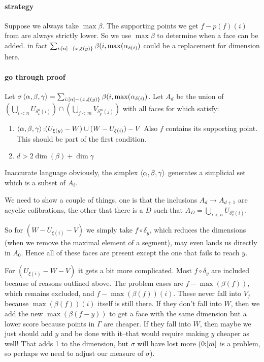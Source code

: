 \documentclass[csh.tex]{subfiles}
\begin{document}
\paragraph{strategy}
Suppose we always take $\max\beta$. 
The supporting points we get $f-p(f)(i)$ from are always strictly lower. So we 
use $\max\beta$ to determine when a face can be added.
in fact $\sum_{i\mathord : [n]-\left\{x,\xi(y)\right\}} \beta(i,\max(\alpha_{\delta(i)})$ could
be a replacement for dimension here.

\paragraph{go through proof}
Let $\sigma\left\langle \alpha,\beta,\gamma \right\rangle = \sum_{i\mathord : [n]-\left\{x,\xi(y)\right\}} \beta(i,\max(\alpha_{\delta(i)})$.
Let $A_d$ be the union of 
$(\bigcup_{i<n} U_{\delta^n_x(i)}) \cap (\bigcup_{j<m} V_{\delta^m_y(j)})$ with 
all faces for which satisfy:
\begin{enumerate}
  \item $\left\langle \alpha,\beta,\gamma \right\rangle\mathord : (U_{\xi(y)}-W)\cup(W-U_{\xi(i)}) - V$
  Also $f$ contains its supporting point.
  This should be part of the first condition.
  \item $d > 2\dim(\beta)+\dim\gamma$
\end{enumerate}
Inaccurate language obviously, the simplex $\left\langle \alpha,\beta,\gamma \right\rangle$ 
generates a simplicial set which is a subset of $A_i$.

We need to show a couple of things, one is that the inclusions $A_d\to A_{d+1}$
are acyclic cofibrations, the other that there is a $D$ such that 
$A_D = \bigcup_{i<n} U_{\delta^n_x(i)} $.

So for $(W-U_{\xi(i)}-V)$ we simply take $f\circ \delta_y$, which reduces the
dimensions (when we remove the maximal element of a
segment), may even lands us directly in $A_0$. Hence all of these faces are 
present except the one that fails to reach $y$.

For $(U_{\xi(i)}-W-V)$ it gets a bit more complicated. Most $f\circ \delta_y$
are included because of reasons outlined above. The problem cases are 
$f-\max(\beta(f))$, which remains excluded, and $f-\max(\beta(f))(i)$.
These never fall into $V_j$ because $\max(\beta(f))(i)$ itself is still there.
If they don't fall into $W$, then we add the new $\max(\beta(f-y))$ to get a
face with the same dimension but a lower score because points in $\Gamma$ are
cheaper. If they fall into $W$, then maybe we just should add $y$ and be done 
with it--that would require making $y$ cheaper as well! 
That adds 1 to the dimension, but $\sigma$ will have lost more 
($0\mathord :[m]$ is a problem, so perhaps we need to adjust our measure of $\sigma$).
\end{document}
